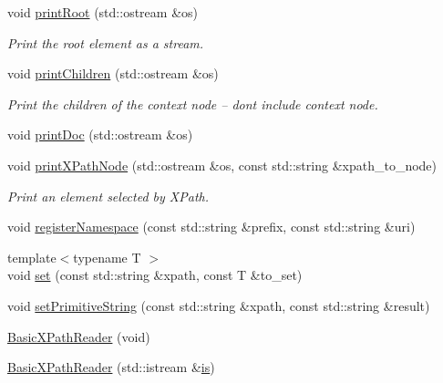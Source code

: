 \begin{DoxyCompactItemize}
void \mbox{\hyperlink{classXMLXPathReader_1_1BasicXPathReader_abc0bfad898a5b01d2251d7aaacbbb507}{print\+Root}} (std\+::ostream \&os)
\begin{DoxyCompactList}\small\item\em Print the root element as a stream. \end{DoxyCompactList}\item 
void \mbox{\hyperlink{classXMLXPathReader_1_1BasicXPathReader_a980f4e08d97855479d47e5b10205075e}{print\+Children}} (std\+::ostream \&os)
\begin{DoxyCompactList}\small\item\em Print the children of the context node -- dont include context node. \end{DoxyCompactList}\item 
void \mbox{\hyperlink{classXMLXPathReader_1_1BasicXPathReader_ab4607adfbae13b0ce3c7e5b944342207}{print\+Doc}} (std\+::ostream \&os)
\item 
void \mbox{\hyperlink{classXMLXPathReader_1_1BasicXPathReader_afba694dbda7c2e1c26ca344085bfffb6}{print\+X\+Path\+Node}} (std\+::ostream \&os, const std\+::string \&xpath\+\_\+to\+\_\+node)
\begin{DoxyCompactList}\small\item\em Print an element selected by X\+Path. \end{DoxyCompactList}\item 
void \mbox{\hyperlink{classXMLXPathReader_1_1BasicXPathReader_a6c6d6e977694344a70506a24bebe853d}{register\+Namespace}} (const std\+::string \&prefix, const std\+::string \&uri)
\item 
{\footnotesize template$<$typename T $>$ }\\void \mbox{\hyperlink{classXMLXPathReader_1_1BasicXPathReader_a4cf7407f107bf4f307b70af4cccbd30e}{set}} (const std\+::string \&xpath, const T \&to\+\_\+set)
\item 
void \mbox{\hyperlink{classXMLXPathReader_1_1BasicXPathReader_a1cc6aa3e855c995ebd874c475a68a076}{set\+Primitive\+String}} (const std\+::string \&xpath, const std\+::string \&result)
\item 
\mbox{\hyperlink{classXMLXPathReader_1_1BasicXPathReader_aeb14ab4d5064a3d2f5e0be7b41da1ab4}{Basic\+X\+Path\+Reader}} (void)
\item 
\mbox{\hyperlink{classXMLXPathReader_1_1BasicXPathReader_ae5addb82da0617e706a5c8879b0b2202}{Basic\+X\+Path\+Reader}} (std\+::istream \&\mbox{\hyperlink{x_8cc_a81abbbdef81e25584a2eab888e643d3d}{is}})
\item 

\end{DoxyCompactItemize}
